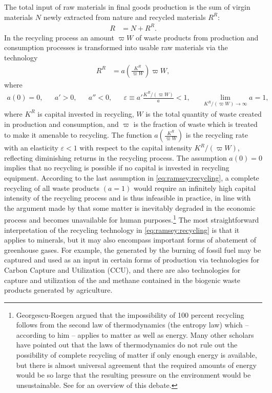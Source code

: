 The total input of raw materials in final goods production is the sum of virgin materials $N$ newly extracted from nature and recycled materials $R^R$:
\begin{align}
R &= N + R^R.
\label{eq:ramsey:materials}
\end{align}
In the recycling process an amount $\varpi W$ of waste products from production and consumption processes is transformed into usable raw materials via the technology
\begin{align}
R^R &= a\left(\frac{K^R}{\varpi W}\right) \varpi W,
\label{eq:ramsey:recycling} 
\end{align}
where 
\begin{align*}
a(0)= 0, && a'> 0, && a'' < 0, && \varepsilon \equiv a' \frac{K^R/(\varpi W)}{a} < 1, && \lim_{K^R/(\varpi W) \to \infty} a = 1,
\end{align*}
where $K^R$ is capital invested in recycling, $W$ is the total quantity of waste created in production and consumption, and $\varpi$ is the fraction of waste which is treated to make it amenable to recycling. The function $a\left(\frac{K^R}{\varpi W}\right)$ is the recycling rate with an elasticity $\varepsilon < 1$ with respect to the capital intensity $K^R/(\varpi W)$, reflecting diminishing returns in the recycling process. The assumption $a(0)=0$ implies that no recycling is possible if no capital is invested in recycling equipment. According to the last assumption in \eqref{eq:ramsey:recycling}, a complete recycling of all waste products $(a=1)$ would require an infinitely high capital intensity of the recycling process and is thus infeasible in practice, in line with the argument made by \textcite{georgescu1971} that some matter is inevitably degraded in the economic process and becomes unavailable for human purposes.\footnote{Georgescu-Roegen argued that the impossibility of 100 percent recycling follows from the second law of thermodynamics (the entropy law) which -- according to him -- applies to matter as well as energy. Many other scholars have pointed out that the laws of thermodynamics do not rule out the possibility of complete recycling of matter if only enough energy is available, but there is almost universal agreement that the required amounts of energy would be so large that the resulting pressure on the environment would be unsustainable. See \textcite{Couix2019} for an overview of this debate.} The most straightforward interpretation of the recycling technology in \eqref{eq:ramsey:recycling} is that it applies to minerals, but it may also encompass important forms of abatement of greenhouse gases. For example, the  generated by the burning of fossil fuel may be captured and used as an input in certain forms of production via technologies for Carbon Capture and Utilization (CCU), and there are also technologies for capture and utilization of the  and methane contained in the biogenic waste products generated by agriculture.

